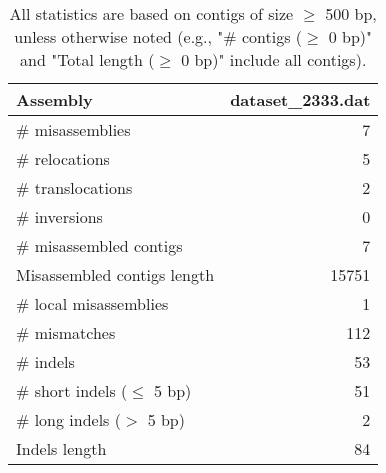 \documentclass[12pt,a4paper]{article}
\begin{document}
\begin{table}[ht]
\begin{center}
\caption{All statistics are based on contigs of size $\geq$ 500 bp, unless otherwise noted (e.g., "\# contigs ($\geq$ 0 bp)" and "Total length ($\geq$ 0 bp)" include all contigs).}
\begin{tabular}{|l*{1}{|r}|}
\hline
Assembly & dataset\_2333.dat \\ \hline
\# misassemblies & 7 \\ \hline
\hspace{5mm}\# relocations & 5 \\ \hline
\hspace{5mm}\# translocations & 2 \\ \hline
\hspace{5mm}\# inversions & 0 \\ \hline
\# misassembled contigs & 7 \\ \hline
Misassembled contigs length & 15751 \\ \hline
\# local misassemblies & 1 \\ \hline
\# mismatches & 112 \\ \hline
\# indels & 53 \\ \hline
\hspace{5mm}\# short indels ($\leq$ 5 bp) & 51 \\ \hline
\hspace{5mm}\# long indels ($>$ 5 bp) & 2 \\ \hline
Indels length & 84 \\ \hline
\end{tabular}
\end{center}
\end{table}
\end{document}
